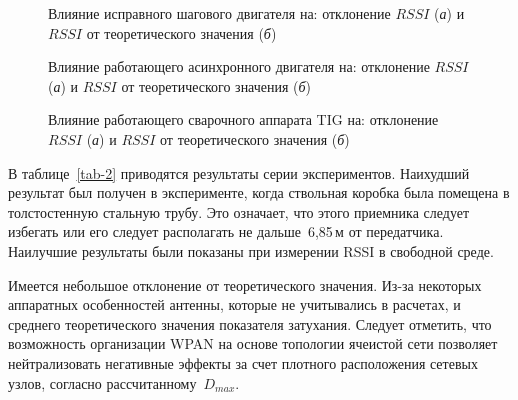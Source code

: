 \begin{figure} [htb]
	\caption[Влияние исправного шагового двигателя на: отклонение $RSSI$ и $RSSI$ от теоретического значения]
	{Влияние исправного шагового двигателя на: отклонение $RSSI$ (\textit{а}) и $RSSI$ от теоретического значения (\textit{б})}
	\label{ch-3/fig-8}
\end{figure}

\begin{figure} [htb]
	\caption[Влияние работающего асинхронного двигателя на: отклонение $RSSI$ и $RSSI$ от теоретического значения]
	{Влияние работающего асинхронного двигателя на: отклонение $RSSI$ (\textit{а}) и $RSSI$ от теоретического значения (\textit{б})}
	\label{ch-3/fig-9}
\end{figure}

\begin{figure} [htb]
	\caption[Влияние работающего сварочного аппарата TIG на: отклонение $RSSI$ и $RSSI$ от теоретического значения]
	{Влияние работающего сварочного аппарата TIG на: отклонение $RSSI$ (\textit{а}) и $RSSI$ от теоретического значения (\textit{б})}
	\label{ch-3/fig-10}
\end{figure}

В таблице~\cref{tab-2} приводятся результаты серии экспериментов. Наихудший результат был получен в эксперименте, когда ствольная коробка была помещена в толстостенную стальную трубу. Это означает, что этого приемника следует избегать или его следует располагать не дальше~6,85\,м от передатчика. Наилучшие результаты были показаны при измерении RSSI в свободной среде.

Имеется небольшое отклонение от теоретического значения. Из-за некоторых аппаратных особенностей антенны, которые не учитывались в расчетах, и среднего теоретического значения показателя затухания. Следует отметить, что возможность организации WPAN на основе топологии ячеистой сети позволяет нейтрализовать негативные эффекты за счет плотного расположения сетевых узлов, согласно рассчитанному~$D_{max}$.

